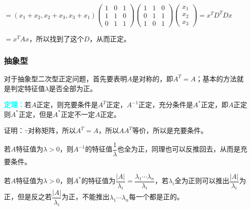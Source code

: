 \documentclass[UTF8, 12pt]{ctexart}
\begin{document}
$=(x_1+x_2,x_2+x_3,x_3+x_1)\left(\begin{array}{ccc}
    1 & 0 & 1 \\
    1 & 1 & 0 \\
    0 & 1 & 1
\end{array}\right)\left(\begin{array}{ccc}
    1 & 1 & 0 \\
    0 & 1 & 1 \\
    1 & 0 & 1
\end{array}\right)\left(\begin{array}{c}
    x_1 \\
    x_2 \\
    x_3
\end{array}\right)=x^TD^TDx$

$=x^TAx$，所以找到了这个$D$，从而正定。

\subsubsection{抽象型}

对于抽象型二次型正定问题，首先要表明$A$是对称的，即$A^T=A$；基本的方法就是判定特征值$\lambda$是否全部为正。

\textcolor{aqua}{\textbf{定理：}}若$A$正定，则充要条件是$A^T$正定，$A^{-1}$正定，充分条件是$A^*$正定，即$A$正定则$A^*$正定，但是$A^*$正定不一定$A$正定。

证明：$\because$对称矩阵，所以$A^T=A$，所以$AA^T$等价，所以是充要条件。

若$A$特征值为$\lambda>0$，则$A^{-1}$的特征值$\dfrac{1}{\lambda}$也全为正，同理也可以反推回去，从而是充要条件。

若$A$特征值为$\lambda>0$，则$A^*$的特征值为$\dfrac{\vert A\vert}{\lambda_i}=\dfrac{\lambda_1\cdots\lambda_n}{\lambda_i}$，若$\lambda_i$全为正则可以推出$\dfrac{\vert A\vert}{\lambda_i}$为正，但是反之若$\dfrac{\vert A\vert}{\lambda_i}$为正，不能推出$\lambda_1\cdots\lambda_n$每一个都是正的。
\end{document}

